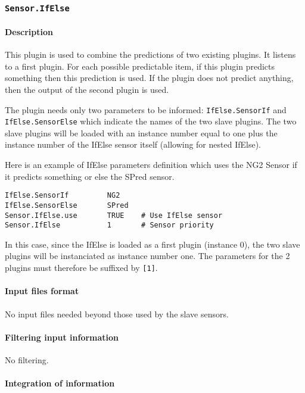 
\subsubsection{\texttt{Sensor.IfElse}}

\paragraph{Description}

This plugin is used to combine the predictions of two existing
plugins. It listens to a first plugin. For each possible predictable
item, if this plugin predicts something then this prediction is used.
If the plugin does not predict anything, then the output of the second
plugin is used.
 
The plugin needs only two parameters to be informed:
\texttt{IfElse.SensorIf} and \texttt{IfElse.SensorElse} which indicate
the names of the two slave plugins. The two slave plugins will be
loaded with an instance number equal to one plus the instance number
of the IfElse sensor itself (allowing for nested IfElse).

Here is an example of IfElse parameters definition which uses the NG2
Sensor if it predicts something or else the SPred sensor.
\begin{Verbatim}[fontsize=\small]
IfElse.SensorIf         NG2
IfElse.SensorElse       SPred
Sensor.IfElse.use       TRUE    # Use IfElse sensor
Sensor.IfElse           1       # Sensor priority
\end{Verbatim}

In this case, since the IfElse is loaded as a first plugin (instance
0), the two slave plugins will be instanciated as instance number
one. The parameters for the 2 plugins must therefore be suffixed by
\texttt{[1]}.

\paragraph{Input files format}

No input files  needed beyond those used by the slave sensors.

\paragraph{Filtering input information}

No filtering.

\paragraph{Integration of information}

